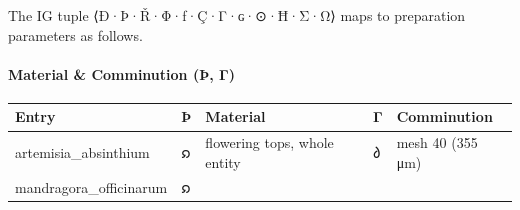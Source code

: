 The IG tuple ⟨Ð·Þ·Ř·Φ·ƒ·Ç·Γ·ɢ·⊙·Ħ·Σ·Ω⟩ maps to preparation parameters as
follows.

\hypertarget{material-comminution-uxfe-ux3b3}{%
\paragraph{Material \& Comminution (Þ,
Γ)}\label{material-comminution-uxfe-ux3b3}}

\begin{longtable}[]{@{}lllll@{}}
\toprule
\begin{minipage}[b]{0.17\columnwidth}\raggedright
Entry\strut
\end{minipage} & \begin{minipage}[b]{0.17\columnwidth}\raggedright
Þ\strut
\end{minipage} & \begin{minipage}[b]{0.17\columnwidth}\raggedright
Material\strut
\end{minipage} & \begin{minipage}[b]{0.17\columnwidth}\raggedright
Γ\strut
\end{minipage} & \begin{minipage}[b]{0.17\columnwidth}\raggedright
Comminution\strut
\end{minipage}\tabularnewline
\midrule
\endhead
\begin{minipage}[t]{0.17\columnwidth}\raggedright
artemisia\_absinthium\strut
\end{minipage} & \begin{minipage}[t]{0.17\columnwidth}\raggedright
𐑸\strut
\end{minipage} & \begin{minipage}[t]{0.17\columnwidth}\raggedright
flowering tops, whole entity\strut
\end{minipage} & \begin{minipage}[t]{0.17\columnwidth}\raggedright
𐑔\strut
\end{minipage} & \begin{minipage}[t]{0.17\columnwidth}\raggedright
mesh 40 (355 μm)\strut
\end{minipage}\tabularnewline
\begin{minipage}[t]{0.17\columnwidth}\raggedright
mandragora\_officinarum\strut
\end{minipage} & \begin{minipage}[t]{0.17\columnwidth}\raggedright
𐑸\strut
\end{minipage} & \begin{minipage}[t]{0.17\columnwidth}\raggedright

\end{minipage}
\end{longtable}
